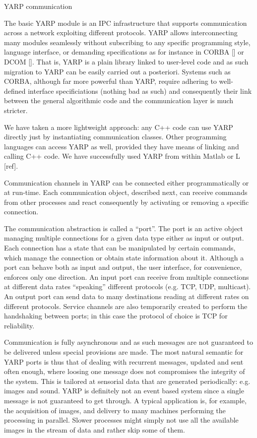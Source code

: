 YARP communication

The basic YARP module is an IPC infrastructure that supports communication across a network 
exploiting different protocols. YARP allows interconnecting many modules seamlessly without 
subscribing to any specific programming style, language interface, or demanding
specifications as for instance in CORBA [] or DCOM []. That is, YARP is a plain library 
linked to user-level code and as such migration to YARP can be easily carried out 
a posteriori. Systems such as CORBA, although far more powerful than YARP, require 
adhering to well-defined interface specificiations (nothing bad as such) and consequently 
their link between the general algorithmic code and the communication layer is much 
stricter. 

We have taken a more lightweight approach: any C++ code can use YARP directly just by 
instantiating communication classes. Other programming languages can access YARP as well, 
provided they have means of linking and calling C++ code. We have successfully used YARP 
from within Matlab or L [ref].

Communication channels in YARP can be connected either programmatically or at run-time.
Each communication object, described next, can receive commands from other processes and 
react consequently by activating or removing a specific connection.

The communication abstraction is called a ``port''. The port is an active object managing
multiple connections for a given data type either as input or output. Each connection has
a state that can be manipulated by certain commands, which manage the connection or obtain
state information about it. Although a port can behave both as input and output, the 
user interface, for convenience, enforces only one direction. An input port can receive 
from multiple connections at different data rates ``speaking'' different protocols
(e.g. TCP, UDP, multicast). An output port can send data to many destinations reading at
different rates on different protocols. Service channels are also temporarily created to
perform the handshaking between ports; in this case the protocol of choice is TCP for
reliability.

Communication is fully asynchronous and as such messages are not guaranteed to be 
delivered unless special provisions are made. The most natural semantic for YARP ports is
thus that of dealing with recurrent messages, updated and sent often enough, where loosing 
one message does not compromises the integrity of the system. This is tailored at
sensorial data that are generated periodically: e.g. images and sound. YARP is definitely
not an event based system since a single message is not guaranteed to get through. A
typical application is, for example, the acquisition of images, and delivery to many 
machines performing the processing in parallel. Slower processes might simply not
use all the available images in the stream of data and rather skip some of them.

